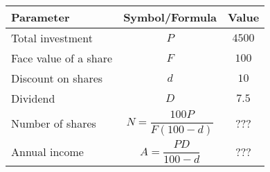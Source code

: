 \begin{tabular}{|l|c|c|}

\hline
\textbf{Parameter} & \textbf{Symbol/Formula} & \textbf{Value} \\
\hline
Total investment & $P$ & $4500$ \\
\hline
Face value of a share & $F$ & $100$ \\
\hline
Discount on shares & $d$ & $10$ \\
\hline
Dividend & $D$ & $7.5$ \\
\hline
Number of shares & $N = \dfrac{100P}{F(100-d)}$ & ??? \\
\hline
Annual income & $A = \dfrac{PD}{100-d}$ & ??? \\
\hline

\end{tabular}